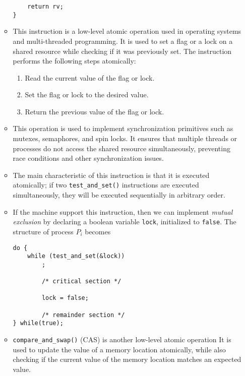 \documentclass{report}
\def\code#1{\texttt{#1}}
\begin{document}
\begin{enumerate}
\begin{itemize}
\begin{verbatim}
    return rv;
}
\end{verbatim}

		      \item This instruction is a low-level atomic operation used in operating systems and multi-threaded programming. It is used to set a flag or a lock on a shared resource while checking if it was previously set. The instruction performs the following steps atomically:

		            \begin{enumerate}
			            \item Read the current value of the flag or lock.
			            \item Set the flag or lock to the desired value.
			            \item Return the previous value of the flag or lock.
		            \end{enumerate}

		      \item This operation is used to implement synchronization primitives such as mutexes, semaphores, and spin locks. It ensures that multiple threads or processes do not access the shared resource simultaneously, preventing race conditions and other synchronization issues.


		      \item The main characteristic of this instruction is that it is executed atomically;
		            if two \code{test\_and\_set()} instructions are executed
		            simultaneously, they will be executed sequentially in arbitrary order.
		      \item If the machine support this instruction, then we can implement \textit{mutual exclusion} by declaring a boolean
		            variable \code{lock}, initialized to \code{false}. The structure of process $ P_{i} $ becomes
		            \begin{verbatim}
do {
    while (test_and_set(&lock))
        ;

        /* critical section */

        lock = false;

        /* remainder section */
} while(true);
\end{verbatim}

		      \item \code{compare\_and\_swap()} (CAS) is another low-level atomic operation
		            It is used to update the value of a memory location atomically, while
		            also checking if the current value of the memory location matches an expected value.


\end{itemize}
\end{enumerate}
\end{document}
